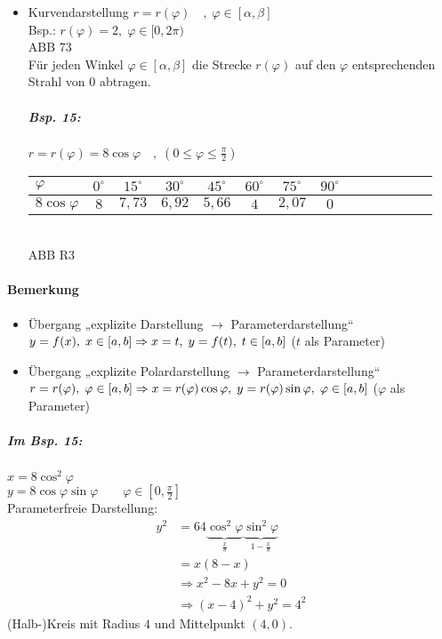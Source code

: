 \begin{enumerate}
\begin{itemize}
ABB 72\\
$x,y$ … karthesische Koordinaten\\
$r, \varphi$ … Polarkoordinaten von $P$ (analog Betrag und Argument einer komplexen Zahl) $r\geq 0, \; \varphi\in \mathbb{R}$\\
Umrechnung:
\begin{align*}
x &= r \cdot \cos \varphi\\
y &= r \cdot \sin \varphi
\end{align*}
\item Kurvendarstellung $r=r(\varphi) \quad , \; \varphi \in [\alpha, \beta]$\\
Bsp.: $r(\varphi)=2, \; \varphi\in [0,2\pi)$\\
ABB 73\\
Für jeden Winkel $\varphi \in [\alpha, \beta]$ die Strecke $r(\varphi)$ auf den $\varphi$ entsprechenden Strahl von $0$ abtragen.
\subparagraph{Bsp. 15:}$r=r(\varphi)=8 \cos \varphi \quad, \; \left(0\leq \varphi \leq \frac{\pi}{2}\right)$\\
\begin{tabular}{l | c c c c c c c c c c c c c}
$\varphi$ & $0^\circ$ & $15^\circ$ & $30^\circ$ & $45^\circ$ & $60^\circ$ & $75^\circ$ & $90^\circ$\\
\hline
$8 \cos \varphi$ & $8$ & $7,73$ & $6,92$ & $5,66$ & $4$ & $2,07$ & $0$
\end{tabular}\\
ABB R3
\end{itemize}
\end{enumerate}
\paragraph{Bemerkung}
\begin{itemize}
\item Übergang „explizite Darstellung $\to$ Parameterdarstellung“\\
$y=f(x), \; x\in [a,b]\\
\Rightarrow x=t, \; y=f(t), \; t\in [a,b]$ ($t$ als Parameter)
\item Übergang „explizite Polardarstellung $\to$ Parameterdarstellung“\\
$r=r(\varphi), \; \varphi\in [a,b]\\
\Rightarrow x=r(\varphi)\cos \varphi, \; y=r(\varphi) \sin \varphi , \; \varphi \in [a,b]$ ($\varphi$ als Parameter)
\end{itemize}
\subparagraph{Im Bsp. 15:} \parskp
$x=8\cos^2 \varphi$\\
$y=8\cos \varphi \sin \varphi \qquad \varphi \in \left[0,\frac{\pi}{2}\right]$\\
Parameterfreie Darstellung:
\begin{align*}
y^2&=64\underbrace{\cos^2 \varphi}_{\tfrac{x}{8}} \underbrace{\sin^2\varphi}_{1-\tfrac{x}{8}}\\
&=x(8-x)\\
&\Rightarrow x^2-8x+y^2=0\\
&\Rightarrow (x-4)^2+y^2=4^2
\end{align*}
(Halb-)Kreis mit Radius $4$ und Mittelpunkt $(4,0)$.
